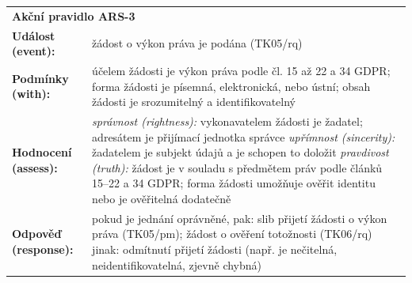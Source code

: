 \begin{itemize}
    \begin{center}
      \renewcommand{\arraystretch}{1.3}
      \begin{tabular}{p{4cm} p{8cm}}
      \multicolumn{2}{l}{\textbf{Akční pravidlo ARS-3}} \\
      \textbf{Událost (event):} & žádost o výkon práva je podána (TK05/rq) \\
      \textbf{Podmínky (with):} & 
        účelem žádosti je výkon práva podle čl. 15 až 22 a 34 GDPR; \newline
        forma žádosti je písemná, elektronická, nebo ústní; \newline
        obsah žádosti je srozumitelný a identifikovatelný \\
      \textbf{Hodnocení (assess):} & 
        \textit{správnost (rightness):} \newline
        \quad vykonavatelem žádosti je žadatel; \newline
        \quad adresátem je přijímací jednotka správce \newline
        \textit{upřímnost (sincerity):} \newline
        \quad žadatelem je subjekt údajů a je schopen to doložit \newline
        \textit{pravdivost (truth):} \newline
        \quad žádost je v souladu s předmětem práv podle článků 15–22 a 34 GDPR; \newline
        \quad forma žádosti umožňuje ověřit identitu nebo je ověřitelná dodatečně \\
      \textbf{Odpověď (response):} & 
        pokud je jednání oprávněné, pak: \newline
        \quad slib přijetí žádosti o výkon práva (TK05/pm); \newline
        \quad žádost o ověření totožnosti (TK06/rq) \newline
        jinak: \newline
        \quad odmítnutí přijetí žádosti (např. je nečitelná, neidentifikovatelná, zjevně chybná) \\
      \end{tabular}
    \end{center}
      

\end{itemize}
